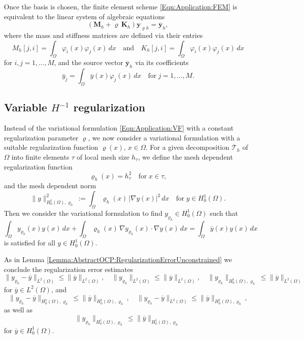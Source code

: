\documentclass{article}
\numberwithin{equation}{section}
\begin{document}
%
Once the basis is chosen, the finite element scheme \eqref{Eqn:Application:FEM}
is equivalent to the linear system of algebraic equations
%
\begin{equation}\label{Eqn:Application:Energy LGS}
(\mathbf{M}_h + \varrho \, \mathbf{K}_h) \mathbf{y}_{\varrho h} = \overline{\mathbf{y}}_h,
\end{equation}
where the mass and stiffness matrices are defined via their entries
\[
 M_h[j,i] = \int_\Omega \varphi_i(x) \varphi_j(x) \, dx %
 \quad \mbox{and} \quad
 K_h[j,i] = \int_\Omega \varphi_i(x) \varphi_j(x) \, dx %
\]
for $i,j=1,\ldots,M$,
and the source vector $\overline{\mathbf{y}}_h$ via its coefficients
\[
  \overline{y}_j =
  \int_\Omega \overline{y}(x) \varphi_j(x) \, dx \quad
  \mbox{for} \; j=1,\ldots,M.
\]
%
\subsection{Variable $H^{-1}$ regularization}
Instead of the variational formulation \eqref{Eqn:Application:VF} with a
constant regularization parameter $\varrho$, we now consider a variational
formulation with a suitable regularization function $\varrho(x)$, $x \in \Omega$. 
For a given decomposition ${\mathcal{T}}_h$ of $\Omega$
into finite elements $\tau$ of local mesh size $h_\tau$, we define
the mesh dependent regularization function
\[
\varrho_h(x) = h_\tau^2 \quad \mbox{for} \; x \in \tau ,
\]
and the mesh dependent norm
\[
  \| y \|^2_{H^1_0(\Omega),\varrho_h} :=
  \int_\Omega \varrho_h(x) \, |\nabla y(x)|^2 \, dx \quad
  \mbox{for} \; y \in H^1_0(\Omega).
\]
Then we consider the variational formulation to find
$y_{\varrho_h} \in H^1_0(\Omega)$ such that
\begin{equation}\label{Eqn:Application:Variable VF}
  \int_\Omega y_{\varrho_h}(x) y(x) \, dx +
  \int_\Omega \varrho_h(x) \, \nabla y_{\varrho_h}(x) \cdot \nabla y(x) \, dx
  =
  \int_\Omega \overline{y}(x) y(x) \, dx
\end{equation}
is satisfied for all $y \in H^1_0(\Omega)$. 

As in Lemma \ref{Lemma:AbstractOCP:RegularizationErrorUnconstrained}
we conclude the regularization error estimates
\[
  \| y_{\varrho_h} - \overline{y} \|_{L^2(\Omega)} \leq
  \| \overline{y} \|_{L^2(\Omega)}, \quad
  \| y_{\varrho_h} \|_{L^2(\Omega)} \leq \| \overline{y} \|_{L^2(\Omega)},
  \quad
  \| y_{\varrho_h} \|_{H^1_0(\Omega),\varrho_h} \leq
    \| \overline{y} \|_{L^2(\Omega)}
\]
for $\overline{y} \in L^2(\Omega)$, and
\[
  \| y_{\varrho_h} - \overline{y} \|_{H^1_0(\Omega),\varrho_h} \leq
  \| \overline{y} \|_{H^1_0(\Omega),\varrho_h}, \quad
  \| y_{\varrho_h} - \overline{y} \|_{L^2(\Omega)} \leq
  \| \overline{y} \|_{H^1_0(\Omega),\varrho_h},
\]
as well as
\[
  \| y_{\varrho_h} \|_{H^1_0(\Omega),\varrho_h} \leq
  \| \overline{y} \|_{H^1_0(\Omega),\varrho_h}
\]
for $\overline{y} \in H^1_0(\Omega)$.
\end{document}
